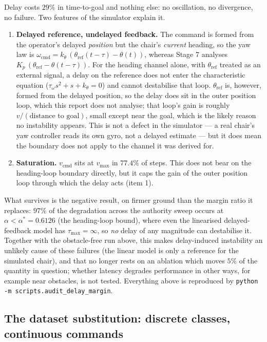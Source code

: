 \documentclass[11pt,a4paper]{article}
\newcommand{\astar}{\alpha^{*}}
\theoremstyle{plain}
\theoremstyle{definition}
\begin{document}
Delay costs $29\%$ in time-to-goal and nothing else: no oscillation, no
divergence, no failure. Two features of the simulator explain it.

\begin{enumerate}
\item \textbf{Delayed reference, undelayed feedback.} The command is
formed from the operator's delayed \emph{position} but the chair's
\emph{current} heading, so the yaw law is $\omega_{\mathrm{cmd}} =
k_\theta\,(\theta_{\mathrm{ref}}(t-\tau) - \theta(t))$, whereas Stage 7
analyses $K_p\,(\theta_{\mathrm{ref}} - \theta(t-\tau))$. For the heading channel
alone, with $\theta_{\mathrm{ref}}$ treated as an external signal, a
delay on the reference does not enter the characteristic equation
($\tau_\omega s^2 + s + k_\theta = 0$) and cannot destabilise that loop.
$\theta_{\mathrm{ref}}$ is, however, formed from the delayed position,
so the delay does sit in the outer position loop, which this report does
not analyse; that loop's gain is roughly $v/(\text{distance to goal})$,
small except near the goal, which is the likely reason no instability
appears. This is not a defect in the simulator --- a real chair's yaw
controller reads its own gyro, not a delayed estimate --- but it does
mean the boundary does not apply to the channel it was derived for.

\item \textbf{Saturation.} $v_{\mathrm{cmd}}$ sits at $v_{\max}$ in
$77.4\%$ of steps. This does not bear on the heading-loop boundary
directly, but it caps the gain of the outer position loop through which
the delay acts (item 1).
\end{enumerate}

What survives is the negative result, on firmer ground than the margin
ratio it replaces: $97\%$ of the degradation across the authority sweep
occurs at $\alpha < \astar = 0.6126$ (the heading-loop bound), where even
the linearised delayed-feedback model has $\tau_{\max} = \infty$, so
\emph{no} delay of any magnitude can destabilise it. Together with
the obstacle-free run above, this makes delay-induced instability an
unlikely cause of these failures (the linear model is only a reference
for the simulated chair), and that no longer rests on an ablation which moves $5\%$ of the quantity in question;
whether latency degrades performance in other ways, for example near
obstacles, is not tested. Everything above is reproduced by
\texttt{python -m scripts.audit\_delay\_margin}.

\subsection{The dataset substitution: discrete classes, continuous commands}
\end{document}
